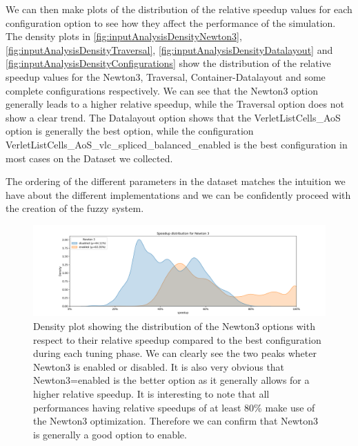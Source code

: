 We can then make plots of the distribution of the relative speedup values for each configuration option to see how they affect the performance of the simulation. The density plots in \autoref{fig:inputAnalysisDensityNewton3}, \autoref{fig:inputAnalysisDensityTraversal}, \autoref{fig:inputAnalysisDensityDatalayout} and \autoref{fig:inputAnalysisDensityConfigurations} show the distribution of the relative speedup values for the Newton3, Traversal, Container-Datalayout and some complete configurations respectively. We can see that the Newton3 option generally leads to a higher relative speedup, while the Traversal option does not show a clear trend. The Datalayout option shows that the VerletListCells\_AoS option is generally the best option, while the configuration VerletListCells\_AoS\_vlc\_spliced\_balanced\_enabled is the best configuration in most cases on the Dataset we collected.

The ordering of the different parameters in the dataset matches the intuition we have about the different implementations and we can be confidently proceed with the creation of the fuzzy system.

\begin{figure}[H]
    \centering
    \includegraphics[width=\columnwidth,trim={1cm 0 2cm 1.5cm},clip]{figures/DataAnalytics/speedup_Newton 3.png}
    \caption[Speedup density plot of Newton 3 option]{Density plot showing the distribution of the Newton3 options with respect to their relative speedup compared to the best configuration during each tuning phase. We can clearly see the two peaks wheter Newton3 is enabled or disabled. It is also very obvious that Newton3=enabled is the better option as it generally allows for a higher relative speedup. It is interesting to note that all performances having relative speedups of at least 80\% make use of the Newton3 optimization. Therefore we can confirm that Newton3 is generally a good option to enable.}
    \label{fig:inputAnalysisDensityNewton3}
\end{figure}

